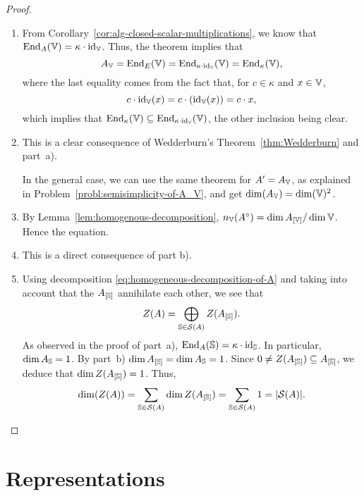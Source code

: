 \begin{proof}${}$
    \begin{enumerate}[\rm a)]
        \item From Corollary~\ref{cor:alg-closed-scalar-multiplications}, we know that ${\operatorname{End}}_A(\mathbb V)=\kappa\cdot\operatorname{id}_\mathbb V$. Thus, the theorem implies that
        $$
            A_\mathbb V={\operatorname{End}}_E(\mathbb V) = {\operatorname{End}}_{\kappa\cdot\operatorname{id}_\mathbb V}(\mathbb V)={\operatorname{End}}_\kappa(\mathbb V),
        $$
        where the last equality comes from the fact that, for $c\in\kappa$ and $x\in \mathbb V$,
        $$
            c\cdot\operatorname{id}_\mathbb V(x) = c\cdot(\operatorname{id}_\mathbb V(x))=c\cdot x,
        $$
        which implies that ${\operatorname{End}}_\kappa(\mathbb V)\subseteq {\operatorname{End}}_{\kappa\cdot\operatorname{id}_\mathbb V}(\mathbb V)$, the other inclusion being clear.

        \item This is a clear consequence of Wedderburn's Theorem~\ref{thm:Wedderburn} and part~a).
        
        In the general case, we can use the same theorem for $A'=A_\mathbb V$, as explained in Problem~\ref{probl:semisimplicity-of-A_V}, and get $\dim(A_\mathbb V)=\dim(\mathbb V)^2$. 

        \item By Lemma~\ref{lem:homogenous-decomposition}, $n_\mathbb V(A^\circ)=\dim A_{[\mathbb V]}/\dim \mathbb V$. Hence the equation.

        \item This is a direct consequence of part b).

        \item Using decomposition \eqref{eq:homogeneous-decomposition-of-A} and taking into account that the $A_{[\mathbb S]}$ annihilate each other, we see that
        $$
            Z(A)=\bigoplus_{\mathbb S\in\mathcal S(A)}Z(A_{[\mathbb S]}).
        $$
        As observed in the proof of part~a), ${\operatorname{End}}_A(\mathbb S)=\kappa\cdot\operatorname{id}_\mathbb S$. In particular, $\dim A_\mathbb S=1$. By part~b) $\dim A_{[\mathbb S]}=\dim A_\mathbb S=1$. Since $0\ne Z(A_{[\mathbb S]})\subseteq A_{[\mathbb S]}$, we deduce that $\dim Z(A_{[\mathbb S]})=1$. Thus,
        $$
            \dim(Z(A))=\sum_{\mathbb S\in\mathcal S(A)}\dim Z(A_{[\mathbb S]})
                = \sum_{\mathbb S\in\mathcal S(A)}1=|\mathcal S(A)|.
        $$
    \end{enumerate}
\end{proof}

\section{Representations}

